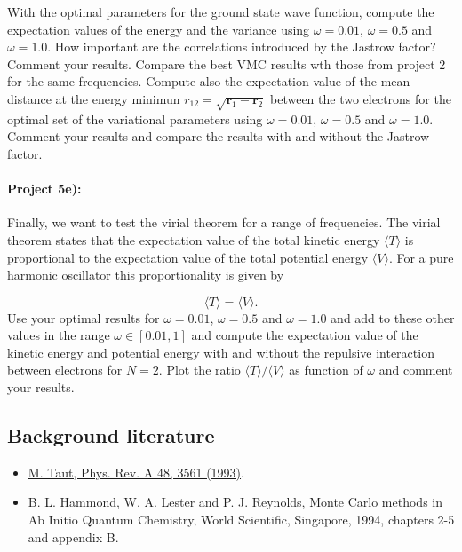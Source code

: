 \documentclass[%
oneside,                 %
final,                   %
10pt]{article}
\begin{document}
With the optimal parameters for the ground state wave function, compute the expectation values of the  energy and the variance using $\omega=0.01$,
  $\omega=0.5$ and $\omega=1.0$. How important are the correlations introduced by the Jastrow factor? Comment your results. Compare the best VMC results wth those from project 2 for the same frequencies.  Compute also the expectation value of the mean distance at the energy minimun 
  $r_{12}=\sqrt{\mathbf{r}_1-\mathbf{r}_2}$ between the two electrons for the optimal set of the variational parameters using $\omega=0.01$,
  $\omega=0.5$ and $\omega=1.0$.  Comment your results and compare the results with and without the Jastrow factor.

\paragraph{Project 5e):}
Finally, we want to test the virial theorem for a range of frequencies. The virial theorem states that the expectation value of the total kinetic energy $\langle T \rangle$ is proportional to the expectation value of the total potential energy $\langle V \rangle$. For a pure harmonic oscillator this proportionality is given by

\begin{equation*}
  \langle T \rangle= \langle V \rangle.
  \end{equation*}
  Use your optimal results for $\omega=0.01$,
  $\omega=0.5$ and $\omega=1.0$ and add to these other values in the range  $\omega\in [0.01,1]$
  and   compute the expectation value of the kinetic energy and potential energy with and without the
  repulsive interaction between electrons for $N=2$. Plot the
  ratio $\langle T \rangle/\langle V \rangle$ as function of
  $\omega$ and comment your results.

\subsection{Background literature}

\begin{itemize}
   \item \href{{http://journals.aps.org/pra/abstract/10.1103/PhysRevA.48.3561}}{M. Taut, Phys. Rev. A 48, 3561 (1993)}.

   \item B. L. Hammond, W. A. Lester and P. J. Reynolds, Monte Carlo methods   in Ab Initio Quantum Chemistry, World Scientific, Singapore, 1994, chapters   2-5 and appendix B.
\end{itemize}
\end{document}

